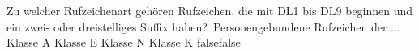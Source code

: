     {Zu welcher Rufzeichenart gehören Rufzeichen, die mit DL1 bis DL9 beginnen und ein zwei- oder dreistelliges Suffix haben? Personengebundene Rufzeichen der ...}
    {Klasse A}
    {Klasse E}
    {Klasse N}
    {Klasse K}
    {false}{false}